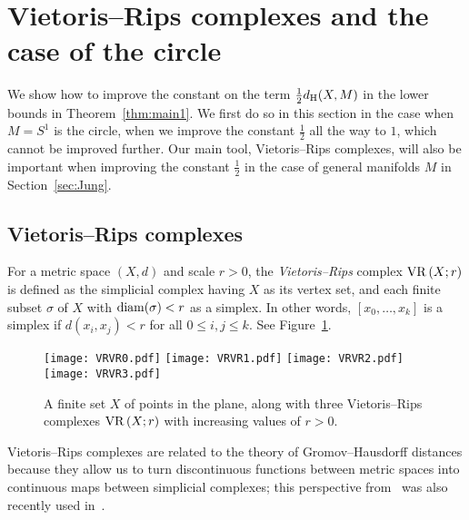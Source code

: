 \documentclass[11pt, reqno, english]{amsart}
\begin{document}
\section{Vietoris--Rips complexes and the case of the circle}
\label{sec:circle}

We show how to improve the constant on the term $\frac{1}{2}d_{\mathrm{H}}(X,M)$ in the lower bounds in Theorem~\ref{thm:main1}.
We first do so in this section in the case when $M=S^1$ is the circle, when we improve the constant $\frac{1}{2}$ all the way to $1$, which cannot be improved further.
Our main tool, Vietoris--Rips complexes, will also be important when improving the constant $\frac{1}{2}$ in the case of general manifolds $M$ in Section~\ref{sec:Jung}.

\subsection*{Vietoris--Rips complexes}
For a metric space $(X,d)$ and scale $r > 0$, the \emph{Vietoris--Rips} complex $\mathrm{VR}\left(X;r\right)$ is defined as the simplicial complex having $X$ as its vertex set,
and each finite subset $\sigma$ of $X$ with $\mathrm{diam}(\sigma)<r$ as a simplex.
In other words, $[x_0,\ldots,x_k]$ is a simplex if $d(x_i,x_j)<r$ for all $0\le i,j\le k$.
See Figure~\ref{fig:vr}.

\begin{figure}[htb]
\centering
\texttt{[image: VRVR0.pdf]}
\hspace{0.17in}
\texttt{[image: VRVR1.pdf]}
\hspace{0.17in}
\texttt{[image: VRVR2.pdf]}
\hspace{0.17in}
\texttt{[image: VRVR3.pdf]}
\caption{A finite set $X$ of points in the plane, along with three Vietoris--Rips complexes $\mathrm{VR}\left(X;r\right)$ with increasing values of $r>0$.}
\label{fig:vr}
\end{figure}

Vietoris--Rips complexes are related to the theory of Gromov--Hausdorff
distances because they allow us to turn discontinuous functions between metric spaces into continuous maps between simplicial complexes; this perspective from~\cite{ChazalDeSilvaOudot2014} was also recently used in~\cite{GH-BU-VR}.
\end{document}
